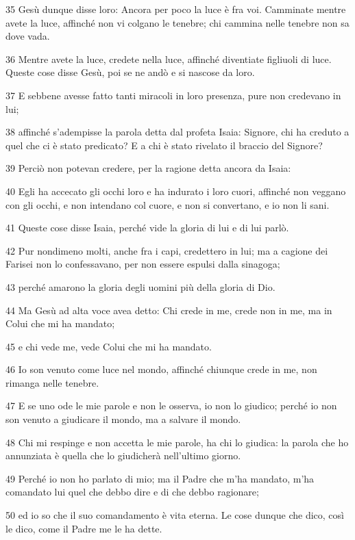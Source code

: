 \par 35 Gesù dunque disse loro: Ancora per poco la luce è fra voi. Camminate mentre avete la luce, affinché non vi colgano le tenebre; chi cammina nelle tenebre non sa dove vada.
\par 36 Mentre avete la luce, credete nella luce, affinché diventiate figliuoli di luce. Queste cose disse Gesù, poi se ne andò e si nascose da loro.
\par 37 E sebbene avesse fatto tanti miracoli in loro presenza, pure non credevano in lui;
\par 38 affinché s'adempisse la parola detta dal profeta Isaia: Signore, chi ha creduto a quel che ci è stato predicato? E a chi è stato rivelato il braccio del Signore?
\par 39 Perciò non potevan credere, per la ragione detta ancora da Isaia:
\par 40 Egli ha accecato gli occhi loro e ha indurato i loro cuori, affinché non veggano con gli occhi, e non intendano col cuore, e non si convertano, e io non li sani.
\par 41 Queste cose disse Isaia, perché vide la gloria di lui e di lui parlò.
\par 42 Pur nondimeno molti, anche fra i capi, credettero in lui; ma a cagione dei Farisei non lo confessavano, per non essere espulsi dalla sinagoga;
\par 43 perché amarono la gloria degli uomini più della gloria di Dio.
\par 44 Ma Gesù ad alta voce avea detto: Chi crede in me, crede non in me, ma in Colui che mi ha mandato;
\par 45 e chi vede me, vede Colui che mi ha mandato.
\par 46 Io son venuto come luce nel mondo, affinché chiunque crede in me, non rimanga nelle tenebre.
\par 47 E se uno ode le mie parole e non le osserva, io non lo giudico; perché io non son venuto a giudicare il mondo, ma a salvare il mondo.
\par 48 Chi mi respinge e non accetta le mie parole, ha chi lo giudica: la parola che ho annunziata è quella che lo giudicherà nell'ultimo giorno.
\par 49 Perché io non ho parlato di mio; ma il Padre che m'ha mandato, m'ha comandato lui quel che debbo dire e di che debbo ragionare;
\par 50 ed io so che il suo comandamento è vita eterna. Le cose dunque che dico, così le dico, come il Padre me le ha dette.

